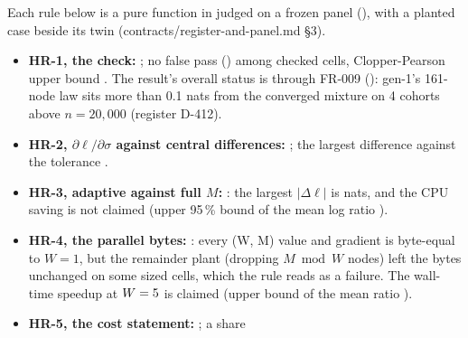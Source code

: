 Each rule below is a pure function in  judged on a frozen panel (), with a
planted case beside its twin (contracts/register-and-panel.md §3).
\begin{itemize}[nosep]
  \item \textbf{HR-1, the check:}
    ; no false pass
    () among
     checked cells,
    Clopper-Pearson upper bound
    .
    The result's overall status is
     through FR-009
    (): gen-1's 161-node law sits more
    than 0.1 nats from the converged mixture on 4 cohorts above $n=20{,}000$ (register D-412).
  \item \textbf{HR-2, $\partial\ell/\partial\sigma$ against central differences:}
    ; the largest difference
     against the
    tolerance .
  \item \textbf{HR-3, adaptive against full $M$:}
    : the largest
    $|\Delta\ell|$ is 
    nats, and the CPU saving is not claimed (upper 95\,\% bound of the mean log ratio
    ).
  \item \textbf{HR-4, the parallel bytes:} : every
    (W, M) value and gradient is byte-equal to $W=1$, but the remainder plant (dropping $M\bmod W$ nodes) left the bytes
    unchanged on some sized cells, which the rule reads as a failure. The wall-time speedup at
    $W=\verify{tests/acceptance/results/hr4_004.json}{verdicts[0].statistic.speedup.W}{d}{5}$ is claimed (upper bound
    of the mean ratio ).
  \item \textbf{HR-5, the cost statement:} ; a share

\end{itemize}
